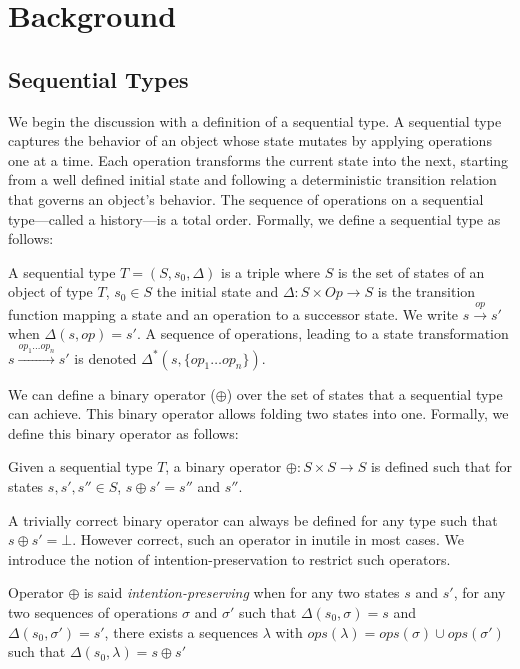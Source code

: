 \section{Background} \label{sec:background}

\subsection{Sequential Types}
We begin the discussion with a definition of a sequential type.
A sequential type captures the behavior of an object whose state mutates by applying operations one at a time. 
Each operation transforms the current state into the next, starting from a well defined initial state and following a deterministic transition relation that governs an object's behavior. 
The sequence of operations on a sequential type---called a history---is a total order.
Formally, we define a sequential type as follows: 

\begin{definition}
A sequential type $T = (S,s_0, \Delta)$  is a triple
    where $S$ is the set of states of an object of type $T$, $s_0 \in S $ the initial state and $\Delta: S \times Op \to S$ is the transition function mapping a state and an operation to a successor state. 
    We write $s \xrightarrow{op} s'$ when $\Delta(s, op) = s'$. 
    A sequence of operations, leading to a state transformation $s \xrightarrow{op_1 \dots op_n} s'$ is denoted $\Delta ^*(s, \{op_1 \dots op_n\})$.
\end{definition}


We can define a binary operator ($\oplus$) over the set of states that a sequential type can achieve.
This binary operator allows folding two states into one. 
Formally, we define this binary operator as follows:

\begin{definition}
  Given a sequential type $T$, a binary operator $\oplus: S \times S \to S$ is defined such that for states $s , s', s'' \in S$, $s \oplus s' = s''$ and $s''$.
\end{definition}

A trivially correct binary operator can always be defined for any type such that $s \oplus s' = \bot$. 
However correct, such an operator in inutile in most cases. 
We introduce the notion of intention-preservation to restrict such operators. 
\begin{definition}
  Operator $\oplus$ is said \emph{intention-preserving} when for any two states $s$ and $s'$, for any two sequences of operations $\sigma$ and $\sigma'$ such that $\Delta(s_0,\sigma)=s$ and $\Delta(s_0,\sigma')=s'$, there exists a sequences $\lambda$ with $ops(\lambda)=ops(\sigma) \cup ops(\sigma')$ such that $\Delta(s_0,\lambda)=s \oplus s'$
\end{definition}


